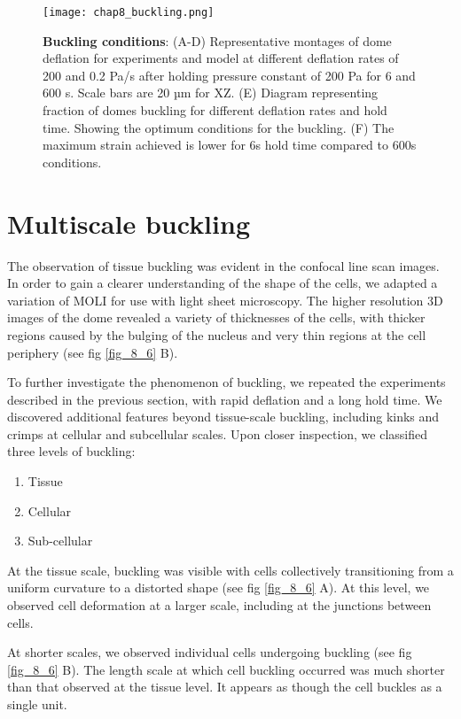 \begin{figure}[h]
	\centering
	\texttt{[image: chap8\_buckling.png]}
	\caption{\label{fig_8_3} \textbf{Buckling conditions}: (A-D) Representative montages of dome deflation for experiments and model at different deflation rates of 200 and 0.2 Pa/s after holding pressure constant of 200 Pa for 6 and 600 s. Scale bars are 20 µm for XZ. (E) Diagram representing fraction of domes buckling for different deflation rates and hold time. Showing the optimum conditions for the buckling. (F) The maximum strain achieved is lower for 6s hold time compared to 600s conditions.
	}
\end{figure}


\hypertarget{multiscale-buckling}{%
	\section{Multiscale buckling}\label{multiscale-buckling}}

The observation of tissue buckling was evident in the confocal line scan images. In order to gain a clearer understanding of the shape of the cells, we adapted a variation of MOLI for use with light sheet microscopy. The higher resolution 3D images of the dome revealed a variety of thicknesses of the cells, with thicker regions caused by the bulging of the nucleus and very thin regions at the cell periphery (see fig \ref{fig_8_6} B).

To further investigate the phenomenon of buckling, we repeated the experiments described in the previous section, with rapid deflation and a long hold time. We discovered additional features beyond tissue-scale buckling, including kinks and crimps at cellular and subcellular scales. Upon closer inspection, we classified three levels of buckling:

\begin{enumerate}
	\item Tissue
	\item Cellular
	\item Sub-cellular
\end{enumerate}

At the tissue scale, buckling was visible with cells collectively transitioning from a uniform curvature to a distorted shape (see fig \ref{fig_8_6} A). At this level, we observed cell deformation at a larger scale, including at the junctions between cells.

At shorter scales, we observed individual cells undergoing buckling (see fig \ref{fig_8_6} B). The length scale at which cell buckling occurred was much shorter than that observed at the tissue level. It appears as though the cell buckles as a single unit.

